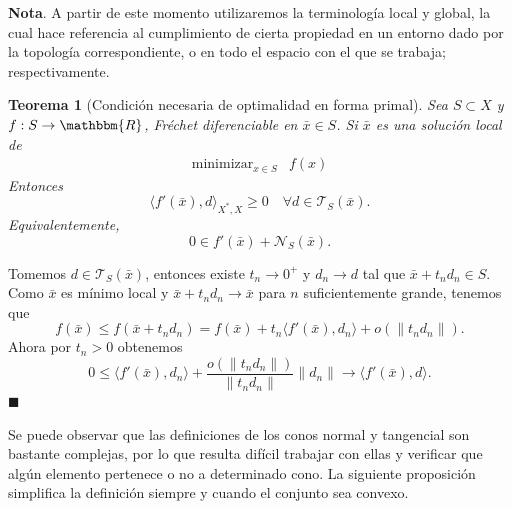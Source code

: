 \documentclass[a4paper,10pt]{book}
\newcommand{\R}{\mathbbm{R}}
\newcommand{\arr}{\rightarrow}
\newcommand{\bx}{\bar{x}}
\newcommand{\cN}{\mathcal{N}}
\newcommand{\cT}{\mathcal{T}}
\newcommand{\la}{\langle}
\newcommand{\ra}{\rangle}
\newtheorem{teo}{Teorema}%
\newenvironment{dem}{\vspace*{-0.1cm}{\it Demostraci\'on:}}{\hfill
$\blacksquare$\\}
\begin{document}
\textbf{Nota}. A partir de este momento utilizaremos la terminología local y global, la cual hace referencia al cumplimiento de cierta propiedad en un entorno dado por la topología correspondiente, o en todo el espacio con el que se trabaja; respectivamente. 

\begin{teo}[Condición necesaria de optimalidad en forma primal]
Sea $S\subset X$ y $f:S\arr\R$, Fréchet diferenciable en $\bx\in S$. Si $\bx$ es una solución local de \[
\begin{array}{rl}
\displaystyle \mathop{\mathrm{minimizar}}_{x\in S} & \displaystyle f(x)
\end{array}
\]   
Entonces $$\langle f'(\bx) , d\rangle_{X^*,X}\geq 0 \quad\forall d\in \cT_S(\bx).$$
Equivalentemente,
$$ 0\in f'(\bx)+ \cN_{S}(\bx).$$
\end{teo}
\begin{dem}
Tomemos $d\in\cT_S(\bx)$, entonces existe $t_n\to 0^+$ y $d_n\to d$ tal que $\bx+t_nd_n\in S$. Como $\bx$ es mínimo local y $\bx+t_nd_n\to\bx$ para $n$ suficientemente grande, tenemos que $$f(\bx)\leq f(\bx+t_nd_n)=f(\bx)+t_n\la f'(\bx),d_n\ra+o(\|t_nd_n\|).$$ Ahora por $t_n>0$ obtenemos $$0\leq\la f'(\bx),d_n\ra+\frac{o(\|t_nd_n\|)}{\|t_n d_n\|}\|d_n\|\to\la f'(\bx),d\ra.$$
\end{dem}

Se puede observar que las definiciones de los conos normal y tangencial son bastante complejas, por lo que resulta difícil trabajar con ellas y verificar que algún elemento pertenece o no a determinado cono. La siguiente proposición simplifica la definición siempre y cuando el conjunto sea convexo.
\end{document}
